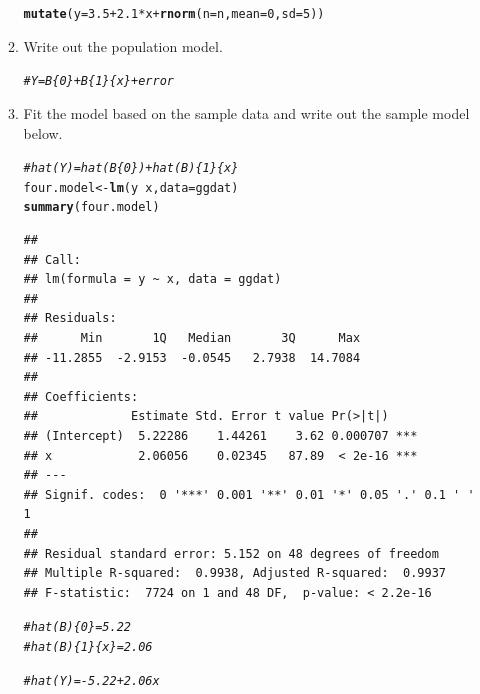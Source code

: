 \documentclass{article}\usepackage[]{graphicx}\usepackage[]{color}
\makeatletter
\newcommand{\hlnum}[1]{\textcolor[rgb]{0.686,0.059,0.569}{#1}}%
\newcommand{\hlcom}[1]{\textcolor[rgb]{0.678,0.584,0.686}{\textit{#1}}}%
\newcommand{\hlopt}[1]{\textcolor[rgb]{0,0,0}{#1}}%
\newcommand{\hlstd}[1]{\textcolor[rgb]{0.345,0.345,0.345}{#1}}%
\newcommand{\hlkwb}[1]{\textcolor[rgb]{0.69,0.353,0.396}{#1}}%
\newcommand{\hlkwc}[1]{\textcolor[rgb]{0.333,0.667,0.333}{#1}}%
\newcommand{\hlkwd}[1]{\textcolor[rgb]{0.737,0.353,0.396}{\textbf{#1}}}%
\newenvironment{kframe}{%
 \def\at@end@of@kframe{}%
 \ifinner\ifhmode%
  \def\at@end@of@kframe{\end{minipage}}%
  \begin{minipage}{\columnwidth}%
 \fi\fi%
 \def\FrameCommand##1{\hskip\@totalleftmargin \hskip-\fboxsep
 \colorbox{shadecolor}{##1}\hskip-\fboxsep
     \hskip-\linewidth \hskip-\@totalleftmargin \hskip\columnwidth}%
 \MakeFramed {\advance\hsize-\width
   \@totalleftmargin\z@ \linewidth\hsize
   \@setminipage}}%
 {\par\unskip\endMakeFramed%
 \at@end@of@kframe}
\newenvironment{knitrout}{}{} %
\makeatother
\begin{document}
\begin{enumerate}
\begin{enumerate}
\begin{knitrout}
\begin{kframe}
\begin{alltt}
  \hlkwd{mutate}\hlstd{(}\hlkwc{y}\hlstd{=}\hlnum{3.5}\hlopt{+}\hlnum{2.1}\hlopt{*}\hlstd{x}\hlopt{+}\hlkwd{rnorm}\hlstd{(}\hlkwc{n}\hlstd{=n,}\hlkwc{mean}\hlstd{=}\hlnum{0}\hlstd{,}\hlkwc{sd}\hlstd{=}\hlnum{5}\hlstd{))}
\end{alltt}
\end{kframe}
\end{knitrout}
    \item Write out the population model.
\begin{knitrout}
\color{fgcolor}\begin{kframe}
\begin{alltt}
\hlcom{#Y=B\{0\}+B\{1\}\{x\} + error}
\end{alltt}
\end{kframe}
\end{knitrout}
    \item Fit the model based on the sample data and write out the sample model below.
\begin{knitrout}
\color{fgcolor}\begin{kframe}
\begin{alltt}
\hlcom{#hat(Y)=hat(B\{0\})+hat(B)\{1\}\{x\}}
\hlstd{four.model}\hlkwb{<-}\hlkwd{lm}\hlstd{(y}\hlopt{~}\hlstd{x,} \hlkwc{data}\hlstd{=ggdat)}
\hlkwd{summary}\hlstd{(four.model)}
\end{alltt}
\begin{verbatim}
## 
## Call:
## lm(formula = y ~ x, data = ggdat)
## 
## Residuals:
##      Min       1Q   Median       3Q      Max 
## -11.2855  -2.9153  -0.0545   2.7938  14.7084 
## 
## Coefficients:
##             Estimate Std. Error t value Pr(>|t|)    
## (Intercept)  5.22286    1.44261    3.62 0.000707 ***
## x            2.06056    0.02345   87.89  < 2e-16 ***
## ---
## Signif. codes:  0 '***' 0.001 '**' 0.01 '*' 0.05 '.' 0.1 ' ' 1
## 
## Residual standard error: 5.152 on 48 degrees of freedom
## Multiple R-squared:  0.9938,	Adjusted R-squared:  0.9937 
## F-statistic:  7724 on 1 and 48 DF,  p-value: < 2.2e-16
\end{verbatim}
\begin{alltt}
\hlcom{#hat(B)\{0\}=5.22}
\hlcom{#hat(B)\{1\}\{x\}=2.06}

\hlcom{#hat(Y)=-5.22+2.06x}


\end{alltt}
\end{kframe}
\end{knitrout}
\end{enumerate}
\end{enumerate}
\end{document}
